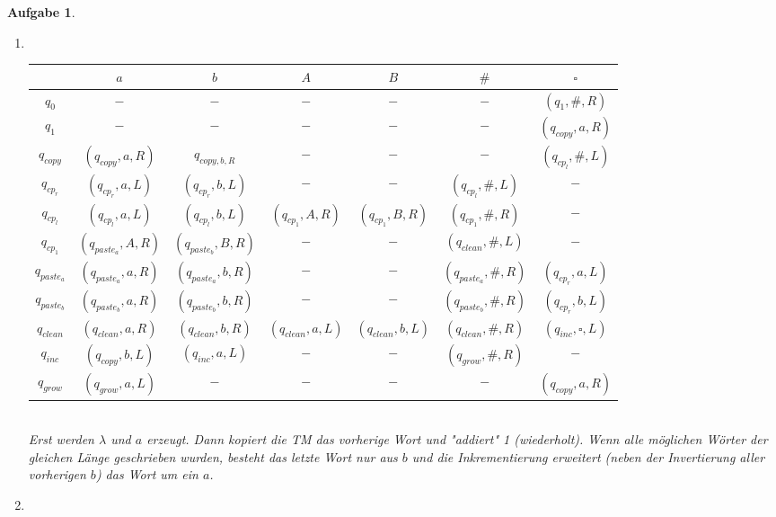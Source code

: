 \documentclass[11pt]{article}
\theoremstyle{break}
\newtheorem{task}{Aufgabe}
\begin{document}
\begin{task}
    \hfill\vspace{-5mm}
    \begin{enumerate}[label={(\alph*)}]
        \item \hfill\vspace{-5mm}\\\begin{tabular}{c|c|c|c|c|c|c}
            &$a$&$b$&$A$&$B$&$\#$&$\square$\\\hline
            $q_0$&$-$&$-$&$-$&$-$&$-$&$(q_1,\#,R)$\\\hline
            $q_1$&$-$&$-$&$-$&$-$&$-$&$(q_{copy},a,R)$\\\hline
            $q_{copy}$&$(q_{copy},a,R)$&$q_{copy,b,R}$&$-$&$-$&$-$&$(q_{cp_l},\#,L)$\\\hline
            $q_{cp_{r}}$&$(q_{cp_{r}},a,L)$&$(q_{cp_{r}},b,L)$&$-$&$-$&$(q_{cp_l},\#,L)$&$-$\\\hline
            $q_{cp_l}$&$(q_{cp_l},a,L)$&$(q_{cp_l},b,L)$&$(q_{cp_1},A,R)$&$(q_{cp_1},B,R)$&$(q_{cp_1},\#,R)$&$-$\\\hline
            $q_{cp_1}$&$(q_{paste_a},A,R)$&$(q_{paste_b},B,R)$&$-$&$-$&$(q_{clean},\#,L)$&$-$\\\hline
            $q_{paste_a}$&$(q_{paste_a},a,R)$&$(q_{paste_a},b,R)$&$-$&$-$&$(q_{paste_a},\#,R)$&$(q_{cp_{r}},a,L)$\\\hline
            $q_{paste_b}$&$(q_{paste_b},a,R)$&$(q_{paste_b},b,R)$&$-$&$-$&$(q_{paste_b},\#,R)$&$(q_{cp_{r}},b,L)$\\\hline
            $q_{clean}$&$(q_{clean},a,R)$&$(q_{clean},b,R)$&$(q_{clean},a,L)$&$(q_{clean},b,L)$&$(q_{clean},\#,R)$&$(q_{inc},\square,L)$\\\hline
            $q_{inc}$&$(q_{copy},b,L)$&$(q_{inc},a,L)$&$-$&$-$&$(q_{grow},\#,R)$&$-$\\\hline
            $q_{grow}$&$(q_{grow},a,L)$&$-$&$-$&$-$&$-$&$(q_{copy},a,R)$
        \end{tabular}\vspace{3mm}\\
        Erst werden $\lambda$ und $a$ erzeugt. Dann kopiert die TM das vorherige Wort und "addiert" 1 (wiederholt). Wenn alle möglichen Wörter der gleichen Länge geschrieben wurden, besteht das letzte Wort nur aus $b$ und die Inkrementierung erweitert (neben der Invertierung aller vorherigen $b$) das Wort um ein $a$.
        \newpage
        \item \hfill\vspace{-5mm}\\\begin{tabular}{c|c|c|c|c}

\end{tabular}
\end{enumerate}
\end{task}
\end{document}
